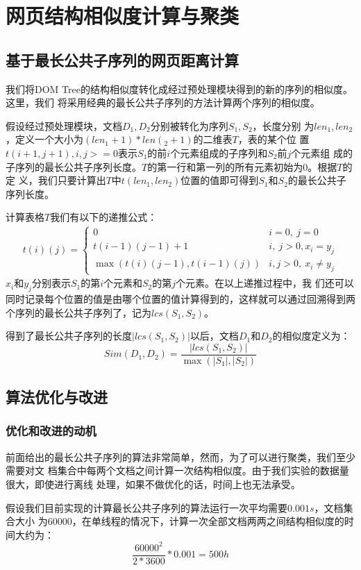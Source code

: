 
\chapter{网页结构相似度计算与聚类}
\label{chap:cluster}
\section{基于最长公共子序列的网页距离计算}
\label{sec:lcs}
我们将DOM Tree的结构相似度转化成经过预处理模块得到的新的序列的相似度。这里，我们
将采用经典的最长公共子序列的方法计算两个序列的相似度。

假设经过预处理模块，文档$D_1,D_2$分别被转化为序列$S_1,S_2$，长度分别
为$len_1,len_2$，定义一个大小为$(len_1+1) * len(_2+1)$的二维表$T$，表的某个位
置$t(i + 1,j + 1),i,j >= 0$表示$S_1$的前$i$个元素组成的子序列和$S_2$前$j$个元素组
成的子序列的最长公共子序列长度。$T$的第一行和第一列的所有元素初始为0。根据$T$的定
义，我们只要计算出$T$中$t(len_1, len_2)$位置的值即可得到$S_1$和$S_2$的最长公共子
序列长度。

计算表格$T$我们有以下的递推公式：
\begin{eqnarray}
  \label{cluster:eqn:lcs}
  t(i)(j) =
  \begin{cases}
    0 & i = 0,\: j = 0\\
    t(i-1)(j-1) + 1 & i,\: j > 0, x_i=y_j\\
    \max(t(i)(j-1), t(i-1)(j)) & i, j > 0,\: x_i \ne y_j
  \end{cases}
\end{eqnarray}
$x_i$和$y_j$分别表示$S_1$的第$i$个元素和$S_2$的第$j$个元素。在以上递推过程中，我
们还可以同时记录每个位置的值是由哪个位置的值计算得到的，这样就可以通过回溯得到两
个序列的最长公共子序列了，记为$lcs(S_1,S_2)$。

得到了最长公共子序列的长度$|lcs(S_1,S_2)|$以后，文档$D_1$和$D_2$的相似度定义为：
\[
Sim(D_1,D_2)=\frac{|lcs(S_1,S_2)|}{\max(|S_1|,|S_2|)}
\]
\section{算法优化与改进}
\label{sec:optimize}
\subsection{优化和改进的动机}
前面给出的最长公共子序列的算法非常简单，然而，为了可以进行聚类，我们至少需要对文
档集合中每两个文档之间计算一次结构相似度。由于我们实验的数据量很大，即使进行离线
处理，如果不做优化的话，时间上也无法承受。

假设我们目前实现的计算最长公共子序列的算法运行一次平均需要$0.001s$，文档集合大小
为$60000$，在单线程的情况下，计算一次全部文档两两之间结构相似度的时间大约为：
\[
\frac{60000^2}{2 * 3600}*0.001=500h
\]

